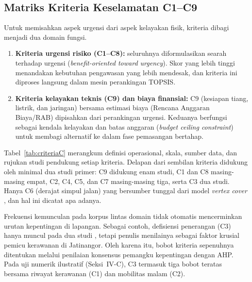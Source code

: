 \documentclass[10pt,twocolumn,a4paper]{article}
\begin{document}
\subsection{Matriks Kriteria Keselamatan C1--C9}
Untuk memisahkan aspek urgensi dari aspek kelayakan fisik, kriteria dibagi menjadi dua domain fungsi.
\begin{enumerate}[label=\arabic*)]
\item \textbf{Kriteria urgensi risiko (C1--C8):} seluruhnya diformulasikan searah terhadap urgensi (\textit{benefit-oriented toward urgency}). Skor yang lebih tinggi menandakan kebutuhan pengawasan yang lebih mendesak, dan kriteria ini diproses langsung dalam mesin perankingan TOPSIS.
\item \textbf{Kriteria kelayakan teknis (C9) dan biaya finansial:} C9 (kesiapan tiang, listrik, dan jaringan) bersama estimasi biaya (Rencana Anggaran Biaya/RAB) dipisahkan dari perankingan urgensi. Keduanya berfungsi sebagai kendala kelayakan dan batas anggaran (\textit{budget ceiling constraint}) untuk membagi alternatif ke dalam fase pemasangan bertahap.
\end{enumerate}
Tabel~\ref{tab:criteriaC} merangkum definisi operasional, skala, sumber data, dan rujukan studi pendukung setiap kriteria. Delapan dari sembilan kriteria didukung oleh minimal dua studi primer: C9 didukung enam studi, C1 dan C8 masing-masing empat, C2, C4, C5, dan C7 masing-masing tiga, serta C3 dua studi. Hanya C6 (derajat simpul jalan) yang bersumber tunggal dari model \textit{vertex cover} \cite{wang}, dan hal ini dicatat apa adanya.

Frekuensi kemunculan pada korpus lintas domain tidak otomatis mencerminkan urutan kepentingan di lapangan. Sebagai contoh, defisiensi penerangan (C3) hanya muncul pada dua studi \cite{baddour,zheng}, tetapi penulis menilainya sebagai faktor krusial pemicu kerawanan di Jatinangor. Oleh karena itu, bobot kriteria sepenuhnya ditentukan melalui penilaian konsensus pemangku kepentingan dengan AHP. Pada uji numerik ilustratif (Seksi~IV-C), C3 termasuk tiga bobot teratas bersama riwayat kerawanan (C1) dan mobilitas malam (C2).
\end{document}
